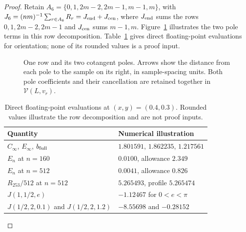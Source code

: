 \begin{proof}
Retain
$A_6=\{0,1,2m-2,2m-1,m-1,m\}$, with
$J_6=(nm)^{-1}\sum_{r\in A_6}R_r=J_{\rm end}+J_{\rm cen}$,
where $J_{\rm end}$ sums the rows $0,1,2m-2,2m-1$ and
$J_{\rm cen}$ sums $m-1,m$.
Figure~\ref{uc:row-poles} illustrates the two pole terms in this row
decomposition. Table~\ref{uc:worked-values} gives direct floating-point
evaluations for orientation; none of its rounded values is a proof input.
\begin{figure}[ht]
\centering
{}
\caption{One row and its two cotangent poles. Arrows show the distance
from each pole to the sample on its right, in sample-spacing units.
Both pole coefficients and their cancellation
are retained together in $\mathcal V(L,v_r)$.}
\label{uc:row-poles}
\end{figure}
\begin{table}[ht]
\centering\small
\caption{Direct floating-point evaluations at $(x,y)=(0.4,0.3)$.
Rounded values illustrate the row decomposition and are not proof inputs.}
\label{uc:worked-values}
\begin{tabular}{@{}ll@{}}\toprule
Quantity & Numerical illustration\\\midrule
$C_\infty$, $E_\infty$, $b_{\rm full}$ & $1.801591$, $1.862235$, $1.217561$\\
$E_n$ at $n=160$ & $0.0100$, allowance $2.349$\\
$E_n$ at $n=512$ & $0.0041$, allowance $0.826$\\
$R_{253}/512$ at $n=512$ & $5.265493$, profile $5.265474$\\
$J(1,1/2,e)$ & $-1.12467$ for $0<e<\pi$\\
$J(1/2,2,0.1)$ and $J(1/2,2,1.2)$ & $-8.55698$ and $-0.28152$\\
\bottomrule\end{tabular}
\end{table}


\end{proof}
